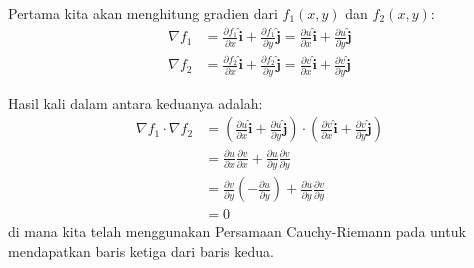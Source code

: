 Pertama kita akan menghitung gradien dari $f_1(x,y)$ dan $f_2(x,y)$:
\begin{align*}
\nabla f_{1} & = \frac{\partial f_{1}}{\partial x}\widehat{\mathbf{i}}+\frac{\partial f_{1}}{\partial y}\widehat{\mathbf{j}}=\frac{\partial u}{\partial x}\widehat{\mathbf{i}}+\frac{\partial u}{\partial y}\widehat{\mathbf{j}}\\
\nabla f_{2} & = \frac{\partial f_{2}}{\partial x}\widehat{\mathbf{i}}+\frac{\partial f_{2}}{\partial y}\widehat{\mathbf{j}}=\frac{\partial v}{\partial x}\widehat{\mathbf{i}}+\frac{\partial v}{\partial y}\widehat{\mathbf{j}}
\end{align*}

Hasil kali dalam antara keduanya adalah:
\begin{align*}
\nabla f_{1}\cdot\nabla f_{2} & = \left(\frac{\partial u}{\partial x}\widehat{\mathbf{i}} + \frac{\partial u}{\partial y}\widehat{\mathbf{j}}\right)\cdot\left(\frac{\partial v}{\partial x}\widehat{\mathbf{i}}+\frac{\partial v}{\partial y}\widehat{\mathbf{j}}\right)\\
 & = \frac{\partial u}{\partial x}\frac{\partial v}{\partial x}+\frac{\partial u}{\partial y}\frac{\partial v}{\partial y}\\
 & = \frac{\partial v}{\partial y}\left(-\frac{\partial u}{\partial y}\right) + \frac{\partial u}{\partial y}\frac{\partial v}{\partial y}\\
 & = 0
\end{align*}
di mana kita telah menggunakan Persamaan Cauchy-Riemann pada untuk mendapatkan baris ketiga dari baris kedua.






